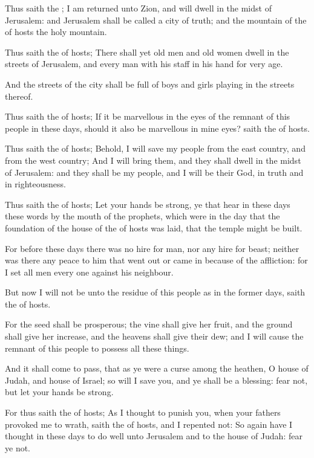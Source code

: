 \verse Thus saith the \LORD; I am returned unto Zion, and will dwell in the midst of Jerusalem: and Jerusalem shall be called a city of truth; and the mountain of the \LORD of hosts the holy mountain.

\verse Thus saith the \LORD of hosts; There shall yet old men and old women dwell in the streets of Jerusalem, and every man with his staff in his hand for very age.

\verse And the streets of the city shall be full of boys and girls playing in the streets thereof.

\verse Thus saith the \LORD of hosts; If it be marvellous in the eyes of the remnant of this people in these days, should it also be marvellous in mine eyes? saith the \LORD of hosts.

\verse Thus saith the \LORD of hosts; Behold, I will save my people from the east country, and from the west country; \verse And I will bring them, and they shall dwell in the midst of Jerusalem: and they shall be my people, and I will be their God, in truth and in righteousness.

\verse Thus saith the \LORD of hosts; Let your hands be strong, ye that hear in these days these words by the mouth of the prophets, which were in the day that the foundation of the house of the \LORD of hosts was laid, that the temple might be built.

\verse For before these days there was no hire for man, nor any hire for beast; neither was there any peace to him that went out or came in because of the affliction: for I set all men every one against his neighbour.

\verse But now I will not be unto the residue of this people as in the former days, saith the \LORD of hosts.

\verse For the seed shall be prosperous; the vine shall give her fruit, and the ground shall give her increase, and the heavens shall give their dew; and I will cause the remnant of this people to possess all these things.

\verse And it shall come to pass, that as ye were a curse among the heathen, O house of Judah, and house of Israel; so will I save you, and ye shall be a blessing: fear not, but let your hands be strong.

\verse For thus saith the \LORD of hosts; As I thought to punish you, when your fathers provoked me to wrath, saith the \LORD of hosts, and I repented not: \verse So again have I thought in these days to do well unto Jerusalem and to the house of Judah: fear ye not.

